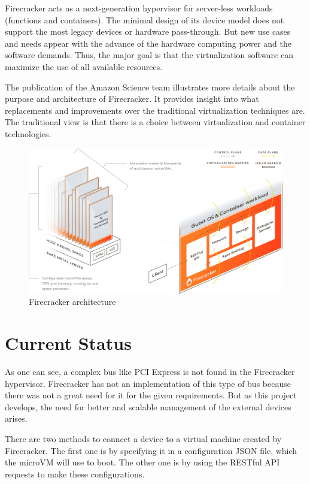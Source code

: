 \documentclass[12pt, a4paper]{report}
\begin{document}
Firecracker acts as a next-generation hypervisor for server-less workloads (functions and containers). The minimal design of its device model does not support the most legacy devices or hardware pass-through. But new use cases and needs appear with the advance of the hardware computing power and the software demands. Thus, the major goal is that the virtualization software can maximize the use of all available resources.

The {publication}\cite{firecracker_article} of the Amazon Science team illustrates more details about the purpose and architecture of Firecracker. It provides insight into what replacements and improvements over the traditional virtualization techniques are. The traditional view is that there is a choice between virtualization and container technologies.

\begin{figure}[H]
\centering
\includegraphics[width=\textwidth, keepaspectratio]{pics/firecracker-architecture.png}
  \caption{{Firecracker architecture}\cite{firecracker_website}}
  \label{fig:firecracker-architecture}
\end{figure}

\section{Current Status}

As one can see, a complex bus like PCI Express is not found in the Firecracker hypervisor. Firecracker has not an implementation of this type of bus because there was not a great need for it for the given requirements. But as this project develops, the need for better and scalable management of the external devices arises.

There are two methods to connect a device to a virtual machine created by Firecracker. The first one is by specifying it in a configuration JSON file, which the microVM will use to boot. The other one is by using the RESTful API requests to make these configurations.
\end{document}
